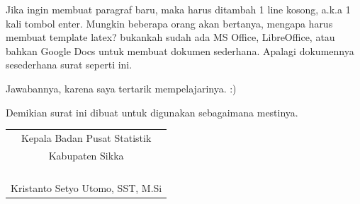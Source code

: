 \documentclass{article}
\begin{document}
Jika ingin membuat paragraf baru, maka harus ditambah 1 line kosong, a.k.a 1 kali tombol enter.
Mungkin beberapa orang akan bertanya, mengapa harus membuat template latex?
bukankah sudah ada MS Office, LibreOffice, atau bahkan Google Docs untuk membuat dokumen sederhana.
Apalagi dokumennya sesederhana surat seperti ini.


Jawabannya, karena saya tertarik mempelajarinya. :)

Demikian surat ini dibuat untuk digunakan sebagaimana mestinya.

\bigskip %

\bigskip
\hfill
\begin{tabular}{@{}c}
	Kepala Badan Pusat Statistik\\
    Kabupaten Sikka \bigskip\\
    \\
    \\
    \\
    \\
	Kristanto Setyo Utomo, SST, M.Si
\end{tabular}
\end{document}
